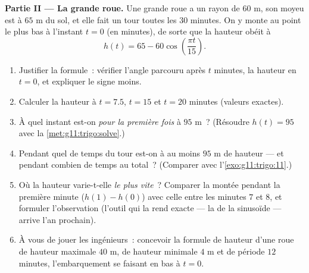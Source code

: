 \begin{problem}
\medskip
\noindent\textbf{Partie II --- La grande roue.}
Une grande roue a un rayon de $60$ m, son moyeu est à $65$ m du sol,
et elle fait un tour toutes les $30$ minutes. On y monte au point le
plus bas à l'instant $t = 0$ (en minutes), de sorte que la hauteur
obéit à
\[
h(t) = 65 - 60 \cos\!\left(\frac{\pi t}{15}\right).
\]
\begin{enumerate}[resume]
  \item Justifier la formule~: vérifier l'angle parcouru après $t$
        minutes, la hauteur en $t = 0$, et expliquer le signe
        moins.
  \item Calculer la hauteur à $t = 7.5$, $t = 15$ et $t = 20$
        minutes (valeurs exactes).
  \item À quel instant est-on \emph{pour la première fois} à
        $95$ m~? (Résoudre $h(t) = 95$ avec la
        \cref{met:g11:trigo:solve}.)
  \item Pendant quel  de temps du tour est-on à au moins
        $95$ m de hauteur --- et pendant combien de temps au total~?
        (Comparer avec l'\cref{exo:g11:trigo:11}.)
  \item Où la hauteur varie-t-elle \emph{le plus vite}~? Comparer
        la montée pendant la première minute ($h(1) - h(0)$) avec
        celle entre les minutes $7$ et $8$, et formuler
        l'observation (l'outil qui la rend exacte --- la  de
        la sinusoïde --- arrive l'an prochain).
  \item À vous de jouer les ingénieurs~: concevoir la formule de
        hauteur d'une roue de hauteur maximale $40$ m, de hauteur
        minimale $4$ m et de période $12$ minutes, l'embarquement se
        faisant en bas à $t = 0$.
\end{enumerate}


\end{problem}
